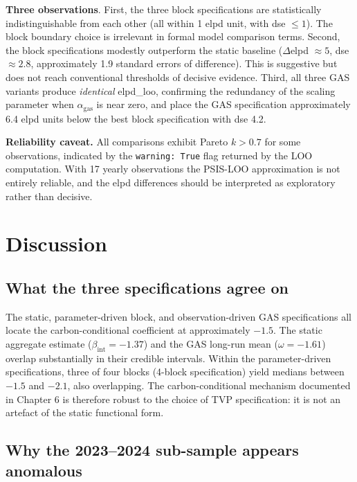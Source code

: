 \documentclass[11pt,a4paper]{article}
\newcommand{\bint}{\beta_{\mathrm{int}}}
\begin{document}
\textbf{Three observations}. First, the three block specifications are statistically indistinguishable from each other (all within 1 elpd unit, with dse $\leq 1$). The block boundary choice is irrelevant in formal model comparison terms. Second, the block specifications modestly outperform the static baseline ($\Delta$elpd $\approx 5$, dse $\approx 2.8$, approximately 1.9 standard errors of difference). This is suggestive but does not reach conventional thresholds of decisive evidence. Third, all three GAS variants produce \textit{identical} elpd\_loo, confirming the redundancy of the scaling parameter when $\alpha_{\mathrm{gas}}$ is near zero, and place the GAS specification approximately 6.4 elpd units below the best block specification with dse 4.2.

\textbf{Reliability caveat.} All comparisons exhibit Pareto $k > 0.7$ for some observations, indicated by the \texttt{warning: True} flag returned by the LOO computation. With 17 yearly observations the PSIS-LOO approximation is not entirely reliable, and the elpd differences should be interpreted as exploratory rather than decisive.

\section{Discussion}
\label{sec:ch7-discussion}

\subsection{What the three specifications agree on}

The static, parameter-driven block, and observation-driven GAS specifications all locate the carbon-conditional coefficient at approximately $-1.5$. The static aggregate estimate ($\bint = -1.37$) and the GAS long-run mean ($\omega = -1.61$) overlap substantially in their credible intervals. Within the parameter-driven specifications, three of four blocks (4-block specification) yield medians between $-1.5$ and $-2.1$, also overlapping. The carbon-conditional mechanism documented in Chapter 6 is therefore robust to the choice of TVP specification: it is not an artefact of the static functional form.

\subsection{Why the 2023--2024 sub-sample appears anomalous}
\end{document}
